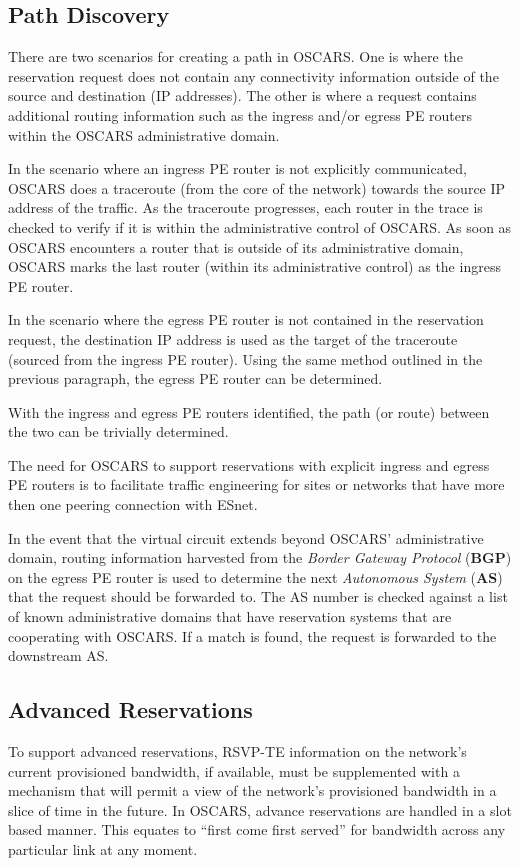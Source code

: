 \documentclass[conference]{IEEEtran}
\begin{document}
\subsection{Path Discovery}
There are two scenarios for creating a path in OSCARS.  One is where the
reservation request does not contain any connectivity information outside of
the source and destination (IP addresses).  The other is where a request
contains additional routing information such as the ingress and/or egress 
PE routers within the OSCARS administrative domain.

In the scenario where an ingress PE router is not explicitly communicated, 
OSCARS does a traceroute (from the core of the network) towards the source IP 
address of the traffic. As the traceroute
progresses, each router in the trace is checked to verify if 
it is within the administrative control of OSCARS. As soon as OSCARS 
encounters a router that
is outside of its administrative domain, OSCARS marks the last router (within 
its administrative control) as the ingress PE router.

In the scenario where the egress PE router is not contained in the reservation 
request, 
the destination IP address is used as the target of the traceroute (sourced 
from the ingress PE router).
Using the same method outlined in the previous paragraph, the egress PE router 
can be determined.

With the ingress and egress PE routers identified, the path (or route) between 
the two can be trivially determined.

The need for OSCARS to support reservations with explicit ingress and egress PE
routers is to
facilitate traffic engineering for sites or networks that have more then one 
peering connection with ESnet.

In the event that the virtual circuit extends beyond OSCARS' administrative 
domain,
routing information harvested from the \emph{Border Gateway Protocol} 
(\textbf{BGP}) on the egress PE router is used to determine the next
\emph{Autonomous System} (\textbf{AS}) that the request should be forwarded 
to.   The AS number is
checked against a list of known administrative domains that have reservation 
systems
that are cooperating with OSCARS.  If a match is found, the request is 
forwarded to the downstream AS.

\subsection{Advanced Reservations }
To support advanced reservations, RSVP-TE information on the network's current
provisioned bandwidth, if available, must be supplemented with a mechanism 
that will permit a view of the network's provisioned bandwidth in a slice of
time in the future.  In OSCARS, advance reservations are handled in a slot 
based manner.  This equates to ``first come first served'' for bandwidth across
any particular link at any moment.
\end{document}
